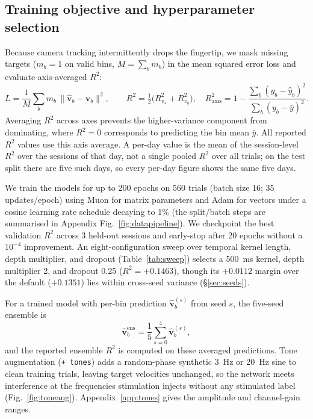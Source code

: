 \documentclass[11pt]{article}
\begin{document}
\subsection{Training objective and hyperparameter selection}\label{sec:loop}
Because camera tracking intermittently drops the fingertip, we mask missing targets ($m_b=1$ on valid bins, $M=\sum_b m_b$) in the mean squared error loss and evaluate axis-averaged $R^2$:
\begin{equation}
L = \frac{1}{M}\sum_b m_b\,\lVert\hat{\mathbf{v}}_b-\mathbf{v}_b\rVert^2, \qquad
R^2 = \tfrac{1}{2}\bigl(R^2_{v_x}+R^2_{v_y}\bigr), \quad
R^2_{\mathrm{axis}} = 1 - \frac{\sum_b (y_b-\hat{y}_b)^2}{\sum_b (y_b-\bar{y})^2}.
\label{eq:r2}
\end{equation}
Averaging $R^2$ across axes prevents the higher-variance component from dominating, where $R^2=0$ corresponds to predicting the bin mean $\bar{y}$. All reported $R^2$ values use this axis average. A per-day value is the mean of the session-level $R^2$ over the sessions of that day, not a single pooled $R^2$ over all trials; on the test split there are five such days, so every per-day figure shows the same five days.

We train the models for up to 200 epochs on 560 trials (batch size 16; 35 updates/epoch) using Muon for matrix parameters and Adam for vectors under a cosine learning rate schedule decaying to 1\% (the split/batch steps are summarised in Appendix Fig.~\ref{fig:datapipeline}). We checkpoint the best validation $R^2$ across 3 held-out sessions and early-stop after 20 epochs without a $10^{-4}$ improvement. An eight-configuration sweep over temporal kernel length, depth multiplier, and dropout (Table~\ref{tab:sweep}) selects a 500~ms kernel, depth multiplier 2, and dropout 0.25 ($R^2 = +0.1463$), though its $+0.0112$ margin over the default ($+0.1351$) lies within cross-seed variance (\S\ref{sec:seeds}).

For a trained model with per-bin prediction $\hat{\mathbf{v}}^{(s)}_b$ from seed $s$, the five-seed ensemble is
\begin{equation}
\hat{\mathbf{v}}^{\mathrm{ens}}_b = \frac{1}{5}\sum_{s=0}^{4}\hat{\mathbf{v}}^{(s)}_b,
\label{eq:ensemble}
\end{equation}
and the reported ensemble $R^2$ is computed on these averaged predictions. Tone augmentation (\texttt{+ tones}) adds a random-phase synthetic 3~Hz or 20~Hz sine to clean training trials, leaving target velocities unchanged, so the network meets interference at the frequencies stimulation injects without any stimulated label (Fig.~\ref{fig:toneaug}). Appendix~\ref{app:tones} gives the amplitude and channel-gain ranges.
\end{document}
